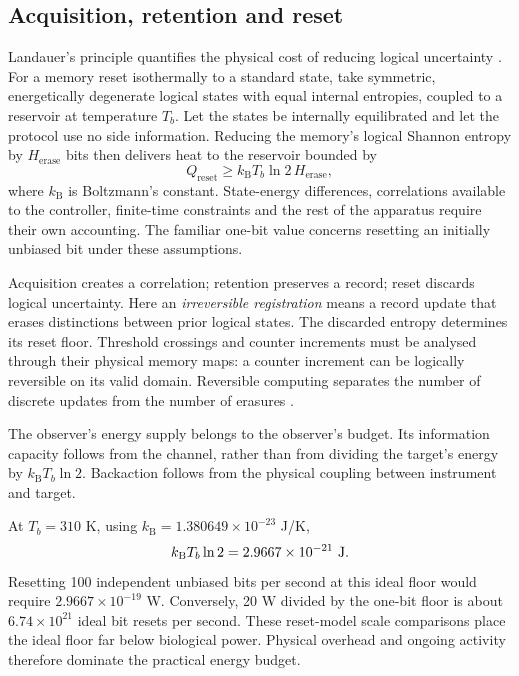 \documentclass[11pt,a4paper]{article}
\begin{document}
\subsection{Acquisition, retention and reset}

Landauer's principle quantifies the physical cost of reducing logical uncertainty \citep{landauer1961,bennett1982}. For a memory reset isothermally to a standard state, take symmetric, energetically degenerate logical states with equal internal entropies, coupled to a reservoir at temperature \(T_b\). Let the states be internally equilibrated and let the protocol use no side information. Reducing the memory's logical Shannon entropy by \(H_{\mathrm{erase}}\) bits then delivers heat to the reservoir bounded by
\begin{equation}
 Q_{\mathrm{reset}}\geq k_{\mathrm B}T_b\ln2\,H_{\mathrm{erase}},
 \label{eq:landauer}
\end{equation}
where \(k_{\mathrm B}\) is Boltzmann's constant. State-energy differences, correlations available to the controller, finite-time constraints and the rest of the apparatus require their own accounting. The familiar one-bit value concerns resetting an initially unbiased bit under these assumptions.

Acquisition creates a correlation; retention preserves a record; reset discards logical uncertainty. Here an \emph{irreversible registration} means a record update that erases distinctions between prior logical states. The discarded entropy determines its reset floor. Threshold crossings and counter increments must be analysed through their physical memory maps: a counter increment can be logically reversible on its valid domain. Reversible computing separates the number of discrete updates from the number of erasures \citep{bennett1973}.

The observer's energy supply belongs to the observer's budget. Its information capacity follows from the channel, rather than from dividing the target's energy by \(k_{\mathrm B}T_b\ln2\). Backaction follows from the physical coupling between instrument and target.

At \(T_b=310\) K, using \(k_{\mathrm B}=1.380649\times10^{-23}\) J/K,
\begin{equation}
 k_{\mathrm B}T_b\ln2
 =2.9667\times10^{-21}\ {\rm J}.
 \label{eq:numericenergy}
\end{equation}
Resetting 100 independent unbiased bits per second at this ideal floor would require \(2.9667\times10^{-19}\) W. Conversely, 20 W divided by the one-bit floor is about \(6.74\times10^{21}\) ideal bit resets per second. These reset-model scale comparisons place the ideal floor far below biological power. Physical overhead and ongoing activity therefore dominate the practical energy budget.
\end{document}
